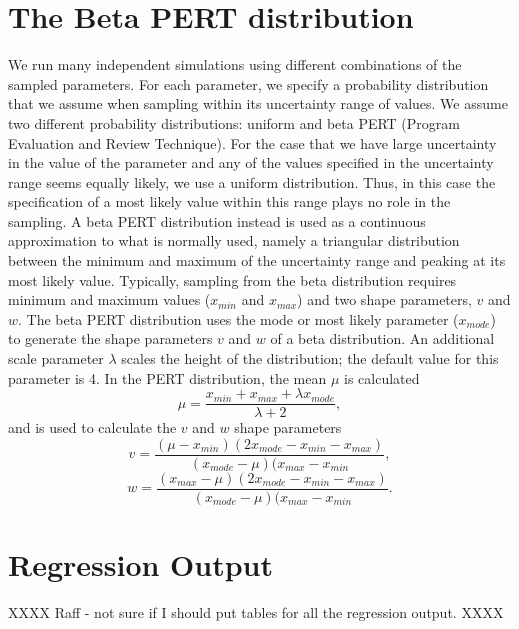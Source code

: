 \documentclass[11pt]{nih_mod}
\begin{document}
\newpage


\appendix

\section{The Beta PERT distribution}
\label{sec:PERT}

We run many independent simulations using different combinations of the sampled parameters. For each parameter, we specify a probability distribution that we assume when sampling within its uncertainty range of values. We assume two different probability distributions: uniform and beta PERT (Program Evaluation and Review Technique). For the case that we have large uncertainty in the value of the parameter and any of the values specified in the uncertainty range seems equally likely, we use a uniform distribution. Thus, in this case the specification of a most likely value within this range plays no role in the sampling. A beta PERT distribution instead is used as a continuous approximation to what is normally used, namely a triangular distribution between the minimum and maximum of the uncertainty range and peaking at its most likely value. Typically, sampling from the beta distribution requires minimum and maximum values ($x_{min}$ and $x_{max}$) and two shape parameters, $v$ and $w$. The beta PERT distribution uses the mode or most likely parameter ($x_{mode}$) to generate the shape parameters $v$ and $w$ of a beta distribution. An additional scale parameter $\lambda$ scales the height of the distribution; the default value for this parameter is 4. In the PERT distribution, the mean $\mu$ is calculated
\begin{equation}
	\mu = \frac{x_{min}+x_{max}+\lambda x_{mode}}{\lambda+2},
\end{equation}
and is used to calculate the $v$ and $w$ shape parameters
\begin{equation}
	v = \frac{(\mu-x_{min})(2x_{mode}-x_{min}-x_{max})} {(x_{mode}-\mu)(x_{max}-x_{min}},
\end{equation}
\begin{equation}
	w = \frac{(x_{max}-\mu)(2x_{mode}-x_{min}-x_{max})}{(x_{mode}-\mu)(x_{max}-x_{min}}.
\end{equation} 

\section{Regression Output}
\label{sec:Regression}

XXXX Raff - not sure if I should put tables for all the regression output. XXXX
 
\pagebreak


\end{document}
